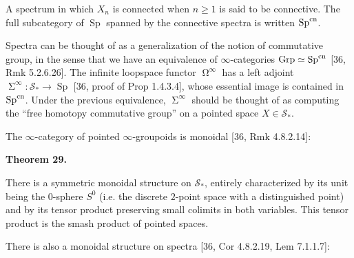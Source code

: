  
A spectrum in which $X_{n}$ is connected when $n\geq 1$ is said to be connective. The full subcategory of $\operatorname{Sp}$ spanned by the connective spectra is written $\operatorname{Sp}^{\textnormal{cn}}$.\par
 
 
 
 
Spectra can be thought of as a generalization of the notion of commutative group, in the sense that we have an equivalence of $\infty$-categories $\operatorname{Grp}\simeq\operatorname{Sp}^{\textnormal{cn}}$ [36, Rmk 5.2.6.26]. The infinite loopspace functor $\operatorname{\Omega}^{\infty}$ has a left adjoint $\operatorname{\Sigma}^{\infty}:{\mathcal{S}}_{*}\to\operatorname{Sp}$ [36, proof of Prop 1.4.3.4], whose essential image is contained in $\operatorname{Sp}^{\textnormal{cn}}$. Under the previous equivalence, $\operatorname{\Sigma}^{\infty}$ should be thought of as computing the “free homotopy commutative group” on a pointed space $X\in{\mathcal{S}}_{*}$.\par
 
 
 
The $\infty$-category of pointed $\infty$-groupoids is monoidal [36, Rmk 4.8.2.14]:\par
 
 
 
\par\medskip\noindent\textbf{Theorem 29.}\par
 
 
There is a symmetric monoidal structure on ${\mathcal{S}}_{*}$, entirely characterized by its unit being the $0$-sphere $S^{0}$ (i.e. the discrete $2$-point space with a distinguished point) and by its tensor product preserving small colimits in both variables. This tensor product is the smash product of pointed spaces.\par
 
 
 
 
There is also a monoidal structure on spectra [36, Cor 4.8.2.19, Lem 7.1.1.7]:\par
 
